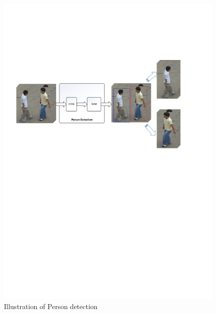 \begin{figure}
	\includegraphics[trim=2cm 15cm 0cm 5cm]{fig01/person_detection.pdf}
	\caption{Illustration of Person detection  }
	\label{fig:person_detection}
\end{figure}


